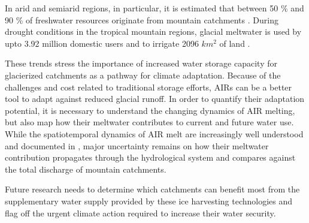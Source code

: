 \documentclass[tc]{copernicus}
\begin{document}
In arid and semiarid regions, in particular, it is estimated that between 50 \% and 90 \% of freshwater
resources originate from mountain catchments \citep{messerliMountainsWorldVulnerable2004}. During drought
conditions in the tropical mountain regions, glacial meltwater is used by upto 3.92 million domestic users and
to irrigate 2096 $km^2$ of land \citep{buytaertGlacialMeltContent2017}.  

These trends stress the importance of increased water storage capacity for glacierized catchments as a pathway
for climate adaptation. Because of the challenges and cost related to traditional storage efforts, AIRs can be
a better tool to adapt against reduced glacial runoff. In order to quantify their adaptation potential, it
is necessary to understand the changing dynamics of AIR melting, but also map how their meltwater contributes to
current and future water use. While the spatiotemporal dynamics of AIR melt are increasingly well understood and
documented in \citet{balasubramanianInfluenceMeteorologicalConditions2022}, major uncertainty remains on how
their meltwater contribution propagates through the hydrological system and compares against the total discharge
of mountain catchments. 

Future research needs to determine which catchments can benefit most from the supplementary water supply
provided by these ice harvesting technologies and flag off the urgent climate action required to increase their
water security.



\end{document}
